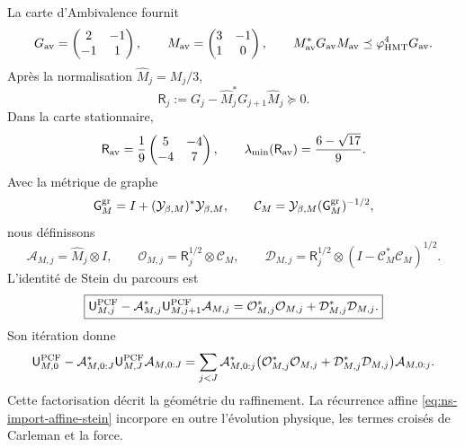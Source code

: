 La carte d'Ambivalence fournit
\begin{equation}
 G_{\rm av}=\begin{pmatrix}2&-1\\-1&1\end{pmatrix},
 \qquad
 M_{\rm av}=\begin{pmatrix}3&-1\\1&0\end{pmatrix},
 \qquad
 M_{\rm av}^*G_{\rm av}M_{\rm av}
 \preceq\varphi_{\rm HMT}^4G_{\rm av}.
 \label{eq:nsclose-ambivalence-route-metric}
\end{equation}
Après la normalisation \(\widehat M_j=M_j/3\),
\begin{equation}
 \mathsf R_j:=G_j-\widehat M_j^*G_{j+1}\widehat M_j\succeq0.
 \label{eq:nsclose-route-exact-defect}
\end{equation}
Dans la carte stationnaire,
\[
 \mathsf R_{\rm av}
 =\frac19\begin{pmatrix}5&-4\\-4&7\end{pmatrix},
 \qquad
 \lambda_{\min}(\mathsf R_{\rm av})
 =\frac{6-\sqrt{17}}9.
\]
Avec la métrique de graphe
\[
 \mathsf G_M^{\rm gr}
 =I+(\mathcal Y_{\beta,M})^*\mathcal Y_{\beta,M},
 \qquad
 \mathcal C_M
 =\mathcal Y_{\beta,M}(\mathsf G_M^{\rm gr})^{-1/2},
\]
nous définissons
\begin{equation}
 \mathcal A_{M,j}=\widehat M_j\otimes I,
 \qquad
 \mathcal O_{M,j}=\mathsf R_j^{1/2}\otimes\mathcal C_M,
 \qquad
 \mathcal D_{M,j}
 =\mathsf R_j^{1/2}\otimes(I-\mathcal C_M^*\mathcal C_M)^{1/2}.
 \label{eq:nsclose-owner-route-column}
\end{equation}
L'identité de Stein du parcours est
\begin{equation}
 \boxed{
 \mathsf U_{M,j}^{\rm PCF}
 -\mathcal A_{M,j}^*\mathsf U_{M,j+1}^{\rm PCF}\mathcal A_{M,j}
 =\mathcal O_{M,j}^*\mathcal O_{M,j}
  +\mathcal D_{M,j}^*\mathcal D_{M,j}.}
 \label{eq:nsclose-owner-stein}
\end{equation}
Son itération donne
\begin{equation}
 \begin{aligned}
 \mathsf U_{M,0}^{\rm PCF}
 -\mathcal A_{M,0:J}^*\mathsf U_{M,J}^{\rm PCF}\mathcal A_{M,0:J}
 =\sum_{j<J}\mathcal A_{M,0:j}^*
 \bigl(\mathcal O_{M,j}^*\mathcal O_{M,j}
      +\mathcal D_{M,j}^*\mathcal D_{M,j}\bigr)
 \mathcal A_{M,0:j}.
 \end{aligned}
 \label{eq:nsclose-owner-stein-telescope}
\end{equation}
Cette factorisation décrit la géométrie du raffinement. La récurrence affine \eqref{eq:ns-import-affine-stein} incorpore en outre l'évolution physique, les termes croisés de Carleman et la force.

